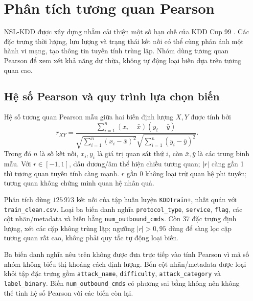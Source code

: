 \documentclass[../main.tex]{subfiles}
\begin{document}
\section{Phân tích tương quan Pearson}
\label{sec:t31:phuong-phap}

NSL-KDD được xây dựng nhằm cải thiện một số hạn chế của KDD Cup 99
\cite{task1_tavallaee2009}. Các đặc trưng thời lượng, lưu lượng và trạng thái
kết nối có thể cùng phản ánh một hành vi mạng, tạo thông tin tuyến tính
trùng lặp. Nhóm dùng tương quan Pearson để xem xét khả năng dư thừa,
không tự động loại biến dựa trên tương quan cao.

\subsection{Hệ số Pearson và quy trình lựa chọn biến}
\label{sec:t31:pearson-r}
Hệ số tương quan Pearson mẫu giữa hai biến định lượng $X,Y$ được tính bởi
\begin{equation}
 r_{XY}=\frac{\sum_{i=1}^{n}(x_i-\bar{x})(y_i-\bar{y})}
 {\sqrt{\sum_{i=1}^{n}(x_i-\bar{x})^2}\sqrt{\sum_{i=1}^{n}(y_i-\bar{y})^2}}.
 \label{eq:t31:pearson}
\end{equation}
Trong đó $n$ là số kết nối, $x_i,y_i$ là giá trị quan sát thứ $i$,
còn $\bar{x},\bar{y}$ là các trung bình mẫu. Với $r\in[-1,1]$,
dấu dương/âm thể hiện chiều tương quan; $|r|$ càng gần 1 thì tương quan
tuyến tính càng mạnh. $r$ gần 0 không loại trừ quan hệ phi tuyến;
tương quan không chứng minh quan hệ nhân quả.

Phân tích dùng $125\,973$ kết nối của tập huấn luyện \texttt{KDDTrain+},
nhất quán với \texttt{train\_clean.csv}. Loại ba biến danh nghĩa
\texttt{protocol\_type}, \texttt{service}, \texttt{flag}, các cột
nhãn/metadata và biến hằng \texttt{num\_outbound\_cmds}. Còn 37 đặc trưng
định lượng, xét các cặp không trùng lặp; ngưỡng $|r|>0{,}95$ dùng để sàng lọc
cặp tương quan rất cao, không phải quy tắc tự động loại biến.

Ba biến danh nghĩa nêu trên không được đưa trực tiếp vào tính Pearson vì mã
số nhóm không biểu thị khoảng cách định lượng. Bốn cột nhãn/metadata được
loại khỏi tập đặc trưng gồm \nolinkurl{attack_name}, \texttt{difficulty},
\nolinkurl{attack_category} và \nolinkurl{label_binary}. Biến
\texttt{num\_outbound\_cmds} có phương sai bằng không nên không thể
tính hệ số Pearson với các biến còn lại.
\end{document}
